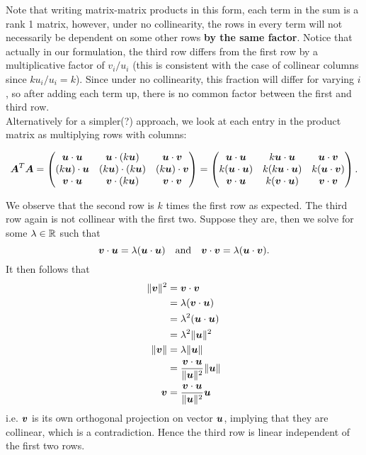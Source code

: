 \documentclass{report}
\begin{document}
	Note that writing matrix-matrix products in this form, each term in the sum is a rank 1 matrix, however, under no collinearity, the rows in every term will not necessarily be dependent on some other rows \textbf{by the same factor}. Notice that actually in our formulation, the third row differs from the first row by a multiplicative factor of $v_i/u_i$ (this is consistent with the case of collinear columns since $ku_i/u_i=k$). Since under no collinearity, this fraction will differ for varying $i$, so after adding each term up, there is no common factor between the first and third row.\\
	
	Alternatively for a simpler(?) approach, we look at each entry in the product matrix as multiplying rows with columns:
	
	$$\boldsymbol{A}^T\boldsymbol{A}=\begin{pmatrix}
		\boldsymbol{u}\cdot\boldsymbol{u} & \boldsymbol{u}\cdot(k\boldsymbol{u}) & \boldsymbol{u}\cdot\boldsymbol{v}\\
		(k\boldsymbol{u})\cdot\boldsymbol{u} & (k\boldsymbol{u})\cdot(k\boldsymbol{u}) & (k\boldsymbol{u})\cdot\boldsymbol{v} \\
		\boldsymbol{v}\cdot\boldsymbol{u} & \boldsymbol{v}\cdot(k\boldsymbol{u}) & \boldsymbol{v}\cdot\boldsymbol{v}
	\end{pmatrix}=\begin{pmatrix}
	\boldsymbol{u}\cdot\boldsymbol{u} & k\boldsymbol{u}\cdot\boldsymbol{u} & \boldsymbol{u}\cdot\boldsymbol{v}\\
	k(\boldsymbol{u}\cdot\boldsymbol{u}) & k(k\boldsymbol{u}\cdot\boldsymbol{u}) & k(\boldsymbol{u}\cdot\boldsymbol{v}) \\
	\boldsymbol{v}\cdot\boldsymbol{u} & k(\boldsymbol{v}\cdot\boldsymbol{u}) & \boldsymbol{v}\cdot\boldsymbol{v}
	\end{pmatrix}.$$
	
	We observe that the second row is $k$ times the first row as expected. The third row again is not collinear with the first two. Suppose they are, then we solve for some $\lm\in\RR$ such that
	$$\boldsymbol{v}\cdot\boldsymbol{u}=\lambda(\boldsymbol{u}\cdot\boldsymbol{u}) \quad \text{and}\quad \boldsymbol{v}\cdot\boldsymbol{v}=\lambda(\boldsymbol{u}\cdot\boldsymbol{v}).$$
	It then follows that
	\begin{align*}
		\|\boldsymbol{v}\|^2&=\boldsymbol{v}\cdot\boldsymbol{v}\\
		&=\lambda(\boldsymbol{v}\cdot\boldsymbol{u})\\
		&=\lambda^2(\boldsymbol{u}\cdot\boldsymbol{u})\\
		&=\lambda^2\|\boldsymbol{u}\|^2\\ 
		\|\boldsymbol{v}\|&=\lambda\|\boldsymbol{u}\|\\
		&=\dfrac{\boldsymbol{v}\cdot\boldsymbol{u}}{\|\boldsymbol{u}\|^2}\|\boldsymbol{u}\|\\
		\boldsymbol{v}&=\dfrac{\boldsymbol{v}\cdot\boldsymbol{u}}{\|\boldsymbol{u}\|^2}\boldsymbol{u}
	\end{align*}
	$$$$
	i.e. $\boldsymbol{v}$ is its own orthogonal projection on vector $\boldsymbol{u}$, implying that they are collinear, which is a contradiction. Hence the third row is linear independent of the first two rows.
\end{document}
